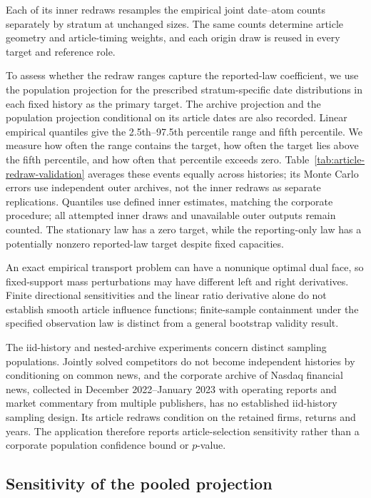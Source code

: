 Each of its  inner redraws resamples the
empirical joint date--atom counts separately by stratum at unchanged sizes.
The same counts determine article geometry and article-timing weights, and
each origin draw is reused in every target and reference role.

To assess whether the redraw ranges capture the reported-law coefficient,
we use the population projection for the prescribed stratum-specific date
distributions in each fixed history as the primary target.
The archive projection and the population projection conditional on its
article dates are also recorded.
Linear empirical quantiles give the 2.5th--97.5th percentile range and fifth
percentile.
We measure how often the range contains the target, how often the target
lies above the fifth percentile, and how often that percentile exceeds zero.
Table~\ref{tab:article-redraw-validation} averages these events equally
across histories; its Monte Carlo errors use independent outer archives,
not the inner redraws as separate replications.
Quantiles use defined inner estimates, matching the corporate procedure;
all attempted inner draws and unavailable outer outputs remain counted.
The stationary law has a zero target, while the reporting-only law has a
potentially nonzero reported-law target despite fixed capacities.



An exact empirical transport problem can have a nonunique optimal dual face,
so fixed-support mass perturbations may have different left and right
derivatives.
Finite directional sensitivities and the linear ratio derivative alone do
not establish smooth article influence functions; finite-sample containment
under the specified observation law is distinct from a general bootstrap
validity result.

The iid-history and nested-archive experiments concern distinct sampling
populations.
Jointly solved competitors do not become independent histories by conditioning
on common news, and the corporate archive of Nasdaq financial news, collected
in December
2022--January 2023 with operating reports and market commentary from multiple
publishers, has no established iid-history sampling design.
Its article redraws condition on the retained firms, returns and years.
The application therefore reports article-selection sensitivity rather than
a corporate population confidence bound or $p$-value.

\subsection{Sensitivity of the pooled projection}\label{app:projection-sensitivity}

